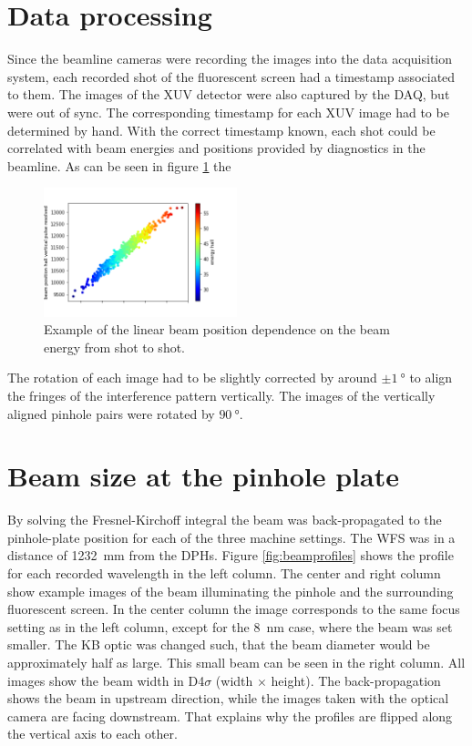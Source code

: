 \documentclass{osa-article}
\begin{document}
\section{Data processing}

Since the beamline cameras were recording the images into the data acquisition system, each recorded shot of the fluorescent screen had a timestamp associated to them. The images of the XUV detector were also captured by the DAQ, but were out of sync. The corresponding timestamp for each XUV image had to be determined by hand. With the correct timestamp known, each shot could be correlated with beam energies and positions provided by diagnostics in the beamline. As can be seen in figure \ref{fig:beam_position_vs_energy} the 

\begin{figure}[htbp]
    \centering
    \includegraphics[width=0.5\textwidth]{gfx/beam_position_vs_energy.png}
    \caption{Example of the linear beam position dependence on the beam energy from shot to shot.}
    \label{fig:beam_position_vs_energy}
\end{figure}

The rotation of each image had to be slightly corrected by around $\pm \SI{1}{\degree}$ to align the fringes of the interference pattern vertically. The images of the vertically aligned pinhole pairs were rotated by $\SI{90}{\degree}$.





\section{Beam size at the pinhole plate}

By solving the Fresnel-Kirchoff integral \cite{Floeter2010NJoP} the beam was back-propagated to the pinhole-plate position for each of the three machine settings. The WFS was in a distance of \SI{1232}{mm} from the DPHs. Figure \ref{fig:beamprofiles} shows the profile for each recorded wavelength in the left column. The center and right column show example images of the beam illuminating the pinhole and the surrounding fluorescent screen. In the center column the image corresponds to the same focus setting as in the left column, except for the \SI{8}{nm} case, where the beam was set smaller. The KB optic was changed such, that the beam diameter would be approximately half as large. This small beam can be seen in the right column. All images show the beam width in D4$\sigma$ (width $\times$ height). The back-propagation shows the beam in upstream direction, while the images taken with the optical camera are facing downstream. That explains why the profiles are flipped along the vertical axis to each other.
\end{document}
